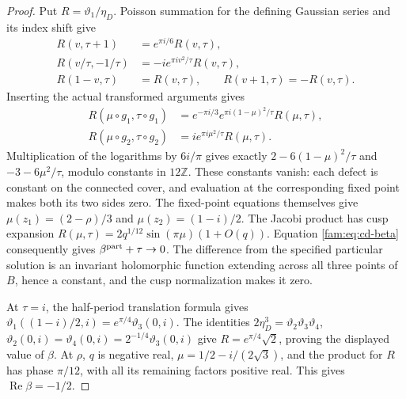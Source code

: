 \begin{proof}
Put \(R=\vartheta_1/\eta_D\). Poisson summation for the defining Gaussian
series and its index shift give
\[
 \begin{aligned}
 R(v,\tau+1)&=e^{\pi i/6}R(v,\tau),\\
 R(v/\tau,-1/\tau)&=-i e^{\pi iv^2/\tau}R(v,\tau),\\
 R(1-v,\tau)&=R(v,\tau),\qquad R(v+1,\tau)=-R(v,\tau).
 \end{aligned}
\]
Inserting the actual transformed arguments gives
\[
 \begin{aligned}
 R(\mu\circ g_1,\tau\circ g_1)
 &=e^{-\pi i/3}e^{\pi i(1-\mu)^2/\tau}R(\mu,\tau),\\
 R(\mu\circ g_2,\tau\circ g_2)
 &=i e^{\pi i\mu^2/\tau}R(\mu,\tau).
 \end{aligned}
\]
Multiplication of the logarithms by \(6i/\pi\) gives exactly
\(2-6(1-\mu)^2/\tau\) and \(-3-6\mu^2/\tau\), modulo constants in
\(12\mathbb Z\). These constants vanish: each defect is constant on the
connected cover, and evaluation at the corresponding fixed point makes
both its two sides zero. The fixed-point equations themselves give
\(\mu(z_1)=(2-\rho)/3\) and \(\mu(z_2)=(1-i)/2\).
The Jacobi product has cusp expansion
\(R(\mu,\tau)=2q^{1/12}\sin(\pi\mu)(1+O(q))\).
Equation \eqref{fam:eq:cd-beta} consequently gives
\(\beta^{\rm part}+\tau\to0\). The difference from the specified particular
solution is an invariant holomorphic function extending across all three
points of \(B\), hence a constant, and the cusp normalization makes it zero.

At \(\tau=i\), the half-period translation formula gives
\(\vartheta_1((1-i)/2,i)=e^{\pi/4}\vartheta_3(0,i)\).
The identities \(2\eta_D^3=\vartheta_2\vartheta_3\vartheta_4\),
\(\vartheta_2(0,i)=\vartheta_4(0,i)=2^{-1/4}\vartheta_3(0,i)\)
give \(R=e^{\pi/4}\sqrt2\), proving the displayed value of \(\beta\).
At \(\rho\), \(q\) is negative real, \(\mu=1/2-i/(2\sqrt3)\), and the
product for \(R\) has phase \(\pi/12\), with all its remaining factors
positive real. This gives \(\operatorname{Re}\beta=-1/2\).
\end{proof}

